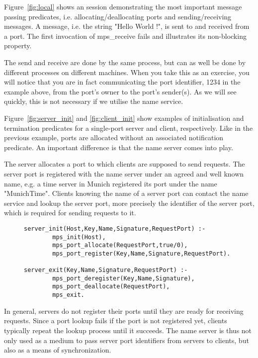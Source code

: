 Figure~\ref{fig:local} shows an \eclipse session demonstrating the most
important message passing predicates, i.e. allocating/deallocating
ports and sending/receiving messages. A message, i.e. the string 
 "Hello World !", is sent to and received from a port. The first
invocation of mps\_receive fails and illustrates its non-blocking
property.

The send and receive are done by the same process, but can as well be
done by different processes on different machines. When you take this
as an exercise, you will notice that you are in fact communicating the 
port identifier, 1234 in the example above, from the port's owner to the 
port's sender(s). As we will see quickly, this is not necessary if
we utilise the name service.

Figure~\ref{fig:server_init} and \ref{fig:client_init} show examples
of initialisation and termination predicates for a single-port
server and client, respectively. Like in the previous example, ports
are allocated without an associated notification predicate. An
important difference is that the name server comes into play.

The server allocates a port to which clients are supposed to send
requests. The server port is registered with the name server under 
an agreed and well known name, e.g. a time server in Munich registered 
its port under the name "MunichTime". Clients knowing the name
of a server port can contact the name service and lookup the server
port, more precisely the identifier of the server port, which is 
required for sending requests to it.

\begin{figure}[hbt]
\begin{verbatim}
server_init(Host,Key,Name,Signature,RequestPort) :- 
        mps_init(Host),
        mps_port_allocate(RequestPort,true/0),
        mps_port_register(Key,Name,Signature,RequestPort).

server_exit(Key,Name,Signature,RequestPort) :-
        mps_port_deregister(Key,Name,Signature),
        mps_port_deallocate(RequestPort),
        mps_exit.
\end{verbatim}
\center{
\caption{\label{fig:server_init} {Server Initialisation and Termination}}}
\end{figure} 

In general, servers do not register their ports until they are ready for 
receiving requests. Since a port lookup fails if the port is not registered 
yet, clients typically repeat the lookup process until it succeeds. The
name server is thus not only used as a medium to pass server port
identifiers from servers to clients, but also as a means of synchronization.

